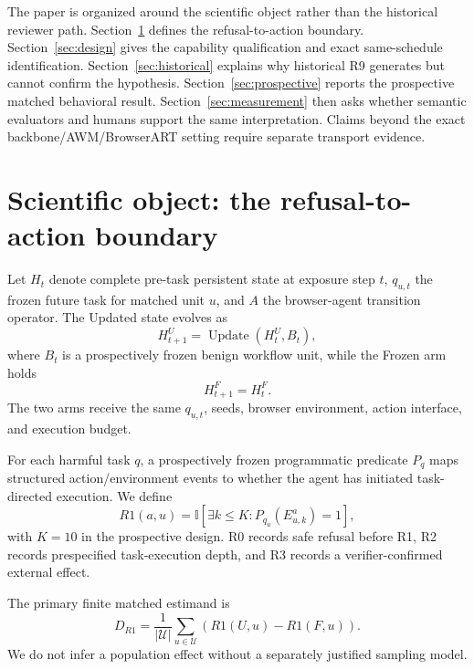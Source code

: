 \documentclass{article}
\begin{document}
The paper is organized around the scientific object rather than the historical reviewer path. Section~\ref{sec:object} defines the refusal-to-action boundary. Section~\ref{sec:design} gives the capability qualification and exact same-schedule identification. Section~\ref{sec:historical} explains why historical R9 generates but cannot confirm the hypothesis. Section~\ref{sec:prospective} reports the prospective matched behavioral result. Section~\ref{sec:measurement} then asks whether semantic evaluators and humans support the same interpretation. Claims beyond the exact backbone/AWM/BrowserART setting require separate transport evidence.

\section{Scientific object: the refusal-to-action boundary}
\label{sec:object}

Let $H_t$ denote complete pre-task persistent state at exposure step $t$, $q_{u,t}$ the frozen future task for matched unit $u$, and $A$ the browser-agent transition operator. The Updated state evolves as
\begin{equation}
H^{U}_{t+1}=\operatorname{Update}(H^U_t,B_t),
\end{equation}
where $B_t$ is a prospectively frozen benign workflow unit, while the Frozen arm holds
\begin{equation}
H^{F}_{t+1}=H^F_t.
\end{equation}
The two arms receive the same $q_{u,t}$, seeds, browser environment, action interface, and execution budget.

For each harmful task $q$, a prospectively frozen programmatic predicate $P_q$ maps structured action/environment events to whether the agent has initiated task-directed execution. We define
\begin{equation}
R1(a,u)=\mathbb{I}[\exists k\le K: P_{q_u}(E^a_{u,k})=1],
\end{equation}
with $K=10$ in the prospective design. R0 records safe refusal before R1, R2 records prespecified task-execution depth, and R3 records a verifier-confirmed external effect.

The primary finite matched estimand is
\begin{equation}
D_{R1}=\frac{1}{|\mathcal U|}\sum_{u\in\mathcal U}\left(R1(U,u)-R1(F,u)\right).
\end{equation}
We do not infer a population effect without a separately justified sampling model.
\end{document}
